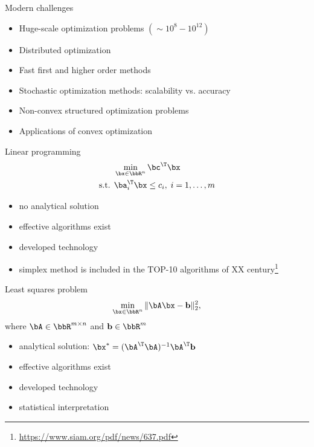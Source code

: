 \documentclass[12pt]{beamer}
\begin{document}
\begin{frame}{Modern challenges}
\begin{itemize}
\item Huge-scale optimization problems $(\sim 10^8-10^{12})$
\item Distributed optimization 
\item Fast first and higher order methods 
\item Stochastic optimization methods: scalability vs. accuracy
\item Non-convex structured optimization problems
\item Applications of convex optimization 
\end{itemize}
\end{frame}

\begin{frame}{Linear programming}
\begin{equation*}
\begin{split}
&\min\limits_{\bx \in \bbR^n} \bc^{\T}\bx\\
\text{s.t. } & \ba^{\T}_i \bx \leq c_i, \; i = 1,\ldots, m
\end{split}
\label{eq::lin_prog}
\end{equation*}
\begin{itemize}
\item no analytical solution
\item effective algorithms exist
\item developed technology
\item simplex method is  included in the TOP-10 algorithms of XX century\footnote{\url{https://www.siam.org/pdf/news/637.pdf}}
\end{itemize}
\end{frame}

\begin{frame}{Least squares problem}
\begin{equation*}
\min\limits_{\bx \in \bbR^n} \|\bA\bx - \mathbf{b} \|^2_2,
\label{eq::least_sq}
\end{equation*}
where $\bA \in \bbR^{m \times n}$ and $\mathbf{b} \in \bbR^m$
\begin{itemize}
\item analytical solution: $\bx^* = (\bA^{\T}\bA)^{-1}\bA^{\T}\mathbf{b}$
\item effective algorithms exist
\item developed technology
\item statistical interpretation
\end{itemize}
\end{frame}
\end{document}
